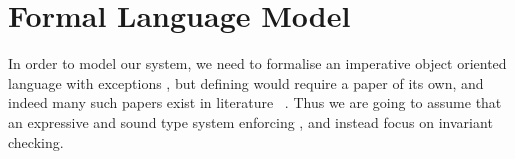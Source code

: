 \section{Formal Language Model}
\label{s:formalism}
\saveSpace

In order to model our system, we need to formalise an imperative object oriented language
with exceptions
, but 
defining  would require a paper
of its own, and indeed many such papers exist in literature%
~\cite{ServettoEtAl13a,ServettoZucca15,GordonEtAl12,clebsch2015deny,JOT:issue_2011_01/article1}.
Thus we are going to assume that  an expressive and sound type system enforcing , and instead focus on invariant checking.


